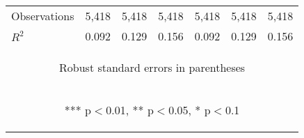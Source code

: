 \begin{center}
\begin{tabular}{lcccccc}
Observations & 5,418 & 5,418 & 5,418 & 5,418 & 5,418 & 5,418 \\
 $R^2$ & 0.092 & 0.129 & 0.156 & 0.092 & 0.129 & 0.156 \\ \hline
\multicolumn{7}{c}{\begin{footnotesize} Robust standard errors in parentheses\end{footnotesize}} \\
\multicolumn{7}{c}{\begin{footnotesize} *** p$<$0.01, ** p$<$0.05, * p$<$0.1\end{footnotesize}} \\
\end{tabular}
\end{center}
